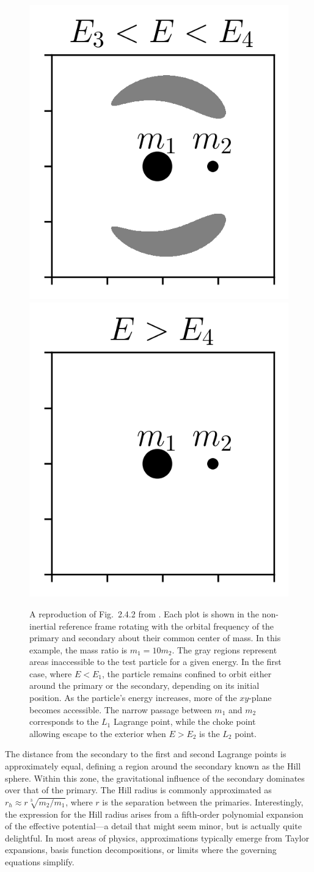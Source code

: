 \begin{figure}
            \includegraphics[width=.32\linewidth]{images/CR3BP_forbidden_region_3.png}
            \includegraphics[width=.32\linewidth]{images/CR3BP_forbidden_region_4.png}
            \caption{A reproduction of Fig.~2.4.2 from \citet{koon2000dynamical}. Each plot is shown in the non-inertial reference frame rotating with the orbital frequency of the primary and secondary about their common center of mass. In this example, the mass ratio is \(m_1 = 10 m_2\). The gray regions represent areas inaccessible to the test particle for a given energy. In the first case, where \(E < E_1\), the particle remains confined to orbit either around the primary or the secondary, depending on its initial position. As the particle's energy increases, more of the \(xy\)-plane becomes accessible. The narrow passage between \(m_1\) and \(m_2\) corresponds to the \(L_1\) Lagrange point, while the choke point allowing escape to the exterior when \(E > E_2\) is the \(L_2\) point.}
            \label{fig:CR3BP_forbidden_region}
        \end{figure}
        The distance from the secondary to the first and second Lagrange points is approximately equal, defining a region around the secondary known as the Hill sphere. Within this zone, the gravitational influence of the secondary dominates over that of the primary. The Hill radius is commonly approximated as \( r_h \approx r\sqrt[3]{m_2/m_1} \), where \( r \) is the separation between the primaries. Interestingly, the expression for the Hill radius arises from a fifth-order polynomial expansion of the effective potential—a detail that might seem minor, but is actually quite delightful. In most areas of physics, approximations typically emerge from Taylor expansions, basis function decompositions, or limits where the governing equations simplify.

